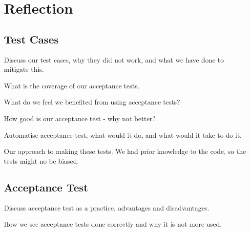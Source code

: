 \section{Reflection}
\subsection{Test Cases}
Discuss our test cases, why they did not work, and what we have done to mitigate this.

What is the coverage of our acceptance tests.

What do we feel we benefited from using acceptance tests?

How good is our acceptance test - why not better?

Automatise acceptance test, what would it do, and what would it take to do it.

Our approach to making these tests. We had prior knowledge to the code, so the tests might no be biased.



\subsection{Acceptance Test}
Discuss acceptance test as a practice, advantages and disadvantages.

How we see acceptance tests done correctly and why it is not more used.
